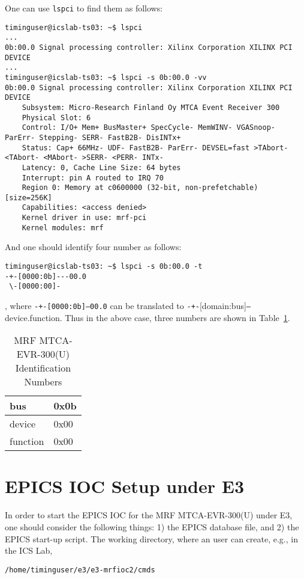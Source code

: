 \documentclass[11pt
  , a4paper
  , article
  , oneside
  , showtrims
]{memoir}
\begin{document}
{One can use \texttt{lspci} to find them as follows:
\begin{lstlisting}[style=termstyle]
timinguser@icslab-ts03: ~$ lspci
...
0b:00.0 Signal processing controller: Xilinx Corporation XILINX PCI DEVICE
...
timinguser@icslab-ts03: ~$ lspci -s 0b:00.0 -vv
0b:00.0 Signal processing controller: Xilinx Corporation XILINX PCI DEVICE
	Subsystem: Micro-Research Finland Oy MTCA Event Receiver 300
	Physical Slot: 6
	Control: I/O+ Mem+ BusMaster+ SpecCycle- MemWINV- VGASnoop- ParErr- Stepping- SERR- FastB2B- DisINTx+
	Status: Cap+ 66MHz- UDF- FastB2B- ParErr- DEVSEL=fast >TAbort- <TAbort- <MAbort- >SERR- <PERR- INTx-
	Latency: 0, Cache Line Size: 64 bytes
	Interrupt: pin A routed to IRQ 70
	Region 0: Memory at c0600000 (32-bit, non-prefetchable) [size=256K]
	Capabilities: <access denied>
	Kernel driver in use: mrf-pci
	Kernel modules: mrf

\end{lstlisting}

And one should identify four number as follows:
\begin{lstlisting}[style=termstyle]
timinguser@icslab-ts03: ~$ lspci -s 0b:00.0 -t
-+-[0000:0b]---00.0
 \-[0000:00]-
\end{lstlisting}
, where \texttt{-+-[0000:0b]---00.0} can be translated to \texttt{-+-}[domain:bus]\texttt{---}device.function. Thus in the above case, three numbers are shown in Table~\ref{table:pciidnumber}.\begin{table}[!htb]
  \centering
  \begin{tabular}{l|l}
    \toprule
    bus      & 0x0b \\\midrule
    device   & 0x00 \\\midrule
    function & 0x00 \\\bottomrule
  \end{tabular}
  \caption[]{MRF MTCA-EVR-300(U) Identification Numbers}
  \label{table:pciidnumber}
\end{table}


\clearpage
\section{EPICS IOC Setup under E3}
In order to start the EPICS IOC for the MRF MTCA-EVR-300(U) under E3, one should consider the following things: 1) the EPICS database file, and 2) the EPICS start-up script. The working directory, where an user can create, e.g., in the ICS Lab,
\begin{lstlisting}[style=termstyle, label={list:pwd}, caption={Working Directory in the ICS lab.} ]
/home/timinguser/e3/e3-mrfioc2/cmds
\end{lstlisting}

}
\end{document}
